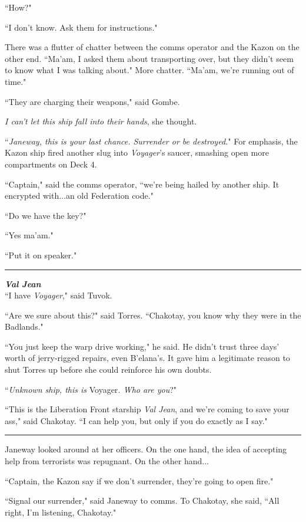 \documentclass[twoside,letterpaper,12pt]{memoir}
\begin{document}
``How?"

``I don't know. Ask them for instructions."

There was a flutter of chatter between the comms operator and the Kazon on the other end. ``Ma'am, I asked them about transporting over, but they didn't seem to know what I was talking about." More chatter. ``Ma'am, we're running out of time."

``They are charging their weapons," said Gombe.

\textit{I can't let this ship fall into their hands}, she thought.

``\textit{Janeway, this is your last chance. Surrender or be destroyed.}" For emphasis, the Kazon ship fired another slug into \textit{Voyager}'s saucer, smashing open more compartments on Deck 4.

``Captain," said the comms operator, ``we're being hailed by another ship. It encrypted with...an old Federation code."

``Do we have the key?"

``Yes ma'am."

``Put it on speaker."

\fancybreak{\rule{3cm}{0.4 pt}}
\noindent\textit{\textbf{Val Jean}}\\

``I have \textit{Voyager}," said Tuvok.

``Are we sure about this?" said Torres. ``Chakotay, you know why they were in the Badlands."

``You just keep the warp drive working," he said. He didn't trust three days' worth of jerry-rigged repairs, even B'elana's. It gave him a legitimate reason to shut Torres up before she could reinforce his own doubts.

``\textit{Unknown ship, this is }Voyager\textit{. Who are you}?"

``This is the Liberation Front starship \textit{Val Jean}, and we're coming to save your ass," said Chakotay. ``I can help you, but only if you do exactly as I say."

\fancybreak{\rule{3cm}{0.4 pt}}
Janeway looked around at her officers. On the one hand, the idea of accepting help from terrorists was repugnant. On the other hand...

``Captain, the Kazon say if we don't surrender, they're going to open fire."

``Signal our surrender," said Janeway to comms. To Chakotay, she said, ``All right, I'm listening, Chakotay."
\end{document}
